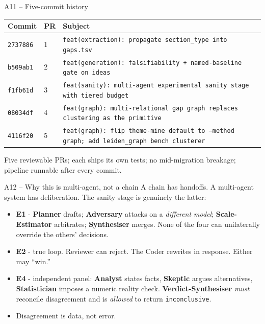 \documentclass[10pt,aspectratio=169]{beamer}
\newcommand{\agent}[1]{\textcolor{accent}{\textbf{#1}}}
\begin{document}
\begin{frame}{A11 -- Five-commit history}
  \scriptsize
  \begin{tabular}{@{}l l l@{}}
    \toprule
    Commit & PR & Subject \\
    \midrule
    \texttt{2737886} & 1 & \texttt{feat(extraction): propagate section\_type into gaps.tsv} \\
    \texttt{b509ab1} & 2 & \texttt{feat(generation): falsifiability + named-baseline gate on ideas} \\
    \texttt{f1fb61d} & 3 & \texttt{feat(sanity): multi-agent experimental sanity stage with tiered budget} \\
    \texttt{08034df} & 4 & \texttt{feat(graph): multi-relational gap graph replaces clustering as the primitive} \\
    \texttt{4116f20} & 5 & \texttt{feat(graph): flip theme-mine default to --method graph; add leiden\_graph bench clusterer} \\
    \bottomrule
  \end{tabular}

  \vspace{1em}
  \footnotesize Five reviewable PRs; each ships its own tests; no
  mid-migration breakage; pipeline runnable after every commit.
\end{frame}

\begin{frame}{A12 -- Why this is multi-agent, not a chain}
  A chain has handoffs. A multi-agent system has deliberation. The
  sanity stage is genuinely the latter:
  \begin{itemize}
    \item \textbf{E1} - \agent{Planner} drafts; \agent{Adversary} attacks on
      a \emph{different model}; \agent{Scale-Estimator} arbitrates;
      \agent{Synthesiser} merges. None of the four can unilaterally
      override the others' decisions.
    \item \textbf{E2} - true loop. Reviewer can reject. The Coder rewrites in
      response. Either may ``win.''
    \item \textbf{E4} - independent panel: \agent{Analyst} states facts,
      \agent{Skeptic} argues alternatives, \agent{Statistician} imposes
      a numeric reality check. \agent{Verdict-Synthesiser} \emph{must}
      reconcile disagreement and is \emph{allowed} to return \texttt{inconclusive}.
    \item Disagreement is data, not error.
  \end{itemize}
\end{frame}
\end{document}
